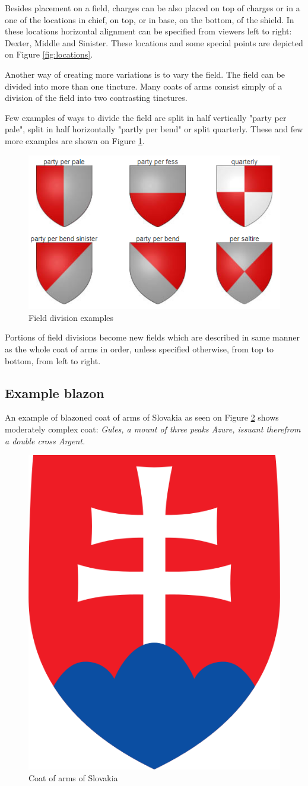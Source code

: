 \documentclass[12pt,a4paper]{article}
\begin{document}
Besides placement on a field, charges can be also placed on top of charges or in a one of the locations in chief, on top, or in base, on the bottom, of the shield.
In these locations horizontal alignment can be specified from viewers left to right: Dexter, Middle and Sinister.
These locations and some special points are depicted on Figure \ref{fig:locations}.

Another way of creating more variations is to vary the field. The field can be divided into more than one tincture.
Many coats of arms consist simply of a division of the field into two contrasting tinctures. \cite{InternationalHeraldry}

Few examples of ways to divide the field are split in half vertically "party per pale", split in half horizontally "partly per bend" or split quarterly. These and few more examples are shown on Figure \ref{fig:fielddivisions}.
\begin{figure}[h]
	\centering
	\includegraphics[width=0.60\linewidth]{img/fieldDivisions}
	\caption{Field division examples}
	\label{fig:fielddivisions}
\end{figure}

Portions of field divisions become new fields which are described in same manner as the whole coat of arms in order, unless specified otherwise, from top to bottom, from left to right.

\subsection{Example blazon}
An example of blazoned coat of arms of Slovakia as seen on Figure \ref{fig:slovakia} shows moderately complex coat:
\textit{Gules, a mount of three peaks Azure, issuant therefrom a double cross Argent.}

\begin{figure}
	\centering
	\includegraphics[width=0.3\linewidth]{img/Slovakia}
	\caption{Coat of arms of Slovakia}
	\label{fig:slovakia}
\end{figure}
\end{document}
